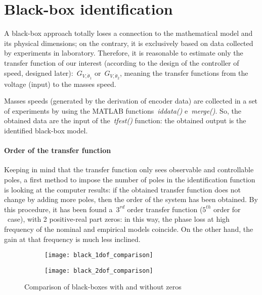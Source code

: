 \section{Black-box identification}

A black-box approach totally loses a connection to the mathematical model and its physical dimensions; on the contrary, it is exclusively based on data collected by experiments in laboratory.
Therefore, it is reasonable to estimate only the transfer function of our interest (according to the design of the controller of speed, designed later):~$G_{V,\dot{\theta}_1}$ or~$G_{V,\dot{\theta}_2}$, meaning the transfer functions from the voltage (input) to the masses speed.

Masses speeds (generated by the derivation of encoder data) are collected in a set of experiments by using the MATLAB functions~\textit{iddata()} e~\textit{merge()}. So, the obtained data are the input of the~\textit{tfest()} function: the obtained output is the identified black-box model.

\paragraph{Order of the transfer function}

Keeping in mind that the transfer function only sees observable and controllable poles, a first method to impose the number of poles in the identification function is looking at the computer results: if the obtained transfer function does not change by adding more poles, then the order of the system has been obtained.
By this procedure, it has been found a~$3^{rd}$ order transfer function ($5^{th}$ order for \twodof\ case), with 2 positive-real part zeros: in this way, the phase loss at high frequency of the nominal and empirical models coincide. On the other hand, the gain at that frequency is much less inclined.
\begin{figure}[h]
	\centering
	\begin{subfigure}{0.45\columnwidth}
		\texttt{[image: black\_1dof\_comparison]}
	\end{subfigure}
	\begin{subfigure}{0.45\columnwidth}
		\texttt{[image: black\_2dof\_comparison]}
	\end{subfigure}
	\caption{Comparison of black-boxes with and without zeros}
	\label{fig:black_comparison}
\end{figure}

